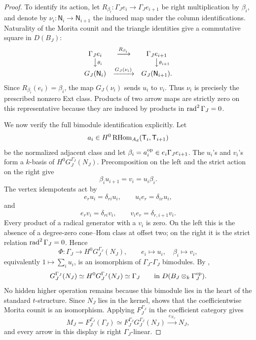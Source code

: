 \begin{proof}
To identify its action, let
\(R_{\beta_i}:\Gamma_Je_i\to\Gamma_Je_{i+1}\) be right multiplication by \(\beta_i\), and denote by \(\nu_i:\mathsf N_i\to\mathsf N_{i+1}\) the induced map under the column identifications.  Naturality of the Morita counit and the triangle identities give a commutative square in \(D(B_J)\):
\[
 \begin{array}{ccc}
 \Gamma_Je_i & \xrightarrow{R_{\beta_i}} & \Gamma_Je_{i+1}\\
 \big\downarrow\rlap{\(\scriptstyle\theta_i\)} &&
 \big\downarrow\rlap{\(\scriptstyle\theta_{i+1}\)}\\
 G_J(\mathsf N_i) & \xrightarrow{G_J(\nu_i)} & G_J(\mathsf N_{i+1}).
 \end{array}
\]
Since \(R_{\beta_i}(e_i)=\beta_i\), the map \(G_J(\nu_i)\) sends \(u_i\) to \(v_i\).  Thus \(\nu_i\) is precisely the prescribed nonzero Ext class.  Products of two arrow maps are strictly zero on this representative because they are induced by products in \(\operatorname{rad}^2\Gamma_J=0\).

We now verify the full bimodule identification explicitly.  Let
\[
 a_i\in H^0\operatorname{RHom}_{A_d}(\mathsf T_i,\mathsf T_{i+1})
\]
be the normalized adjacent class and let
\(\beta_i=a_i^{\mathrm{op}}\in e_i\Gamma_Je_{i+1}\).  The \(u_i\)'s and \(v_i\)'s form a \(k\)-basis of \(H^0G_J^{\Gamma_J}(N_J)\).  Precomposition on the left and the strict action on the right give
\[
 \beta_i u_{i+1}=v_i=u_i\beta_i.
\]
The vertex idempotents act by
\[
 e_ru_i=\delta_{ri}u_i,
 \qquad
 u_ie_r=\delta_{ir}u_i,
\]
and
\[
 e_rv_i=\delta_{ri}v_i,
 \qquad
 v_ie_r=\delta_{r,i+1}v_i.
\]
Every product of a radical generator with a \(v_i\) is zero.  On the left this is the absence of a degree-zero cone--Hom class at offset two; on the right it is the strict relation \(\operatorname{rad}^2\Gamma_J=0\).  Hence
\[
 \Phi:\Gamma_J\longrightarrow H^0G_J^{\Gamma_J}(N_J),
 \qquad
 e_i\longmapsto u_i,
 \quad
 \beta_i\longmapsto v_i,
\]
equivalently \(1\mapsto\sum_i u_i\), is an isomorphism of
\(\Gamma_J\)-\(\Gamma_J\) bimodules.  By
,
\[
 G_J^{\Gamma_J}(N_J)\simeq H^0G_J^{\Gamma_J}(N_J)\simeq\Gamma_J
 \qquad\text{in }D(B_J\otimes_k\Gamma_J^{\mathrm{op}}).
\]
No hidden higher operation remains because this bimodule lies in the heart of the standard \(t\)-structure.  Since \(N_J\) lies in the kernel,  shows that the coefficientwise Morita counit is an isomorphism.  Applying \(F_J^{\Gamma_J}\) in the coefficient category gives
\[
 M_J=F_J^{\Gamma_J}(\Gamma_J)
 \simeq F_J^{\Gamma_J}G_J^{\Gamma_J}(N_J)
 \xrightarrow{\ \varepsilon_{N_J}\ }N_J,
\]
and every arrow in this display is right \(\Gamma_J\)-linear.
\end{proof}

